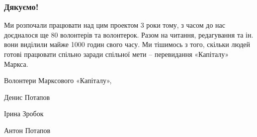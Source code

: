 \documentclass{kapital}
\begin{document}
{  \subsubsection*{Дякуємо!}

  Ми розпочали працювати над цим проектом 3 роки тому, з часом до нас доєдналося ще 80 волонтерів та волонтерок. Разом на читання, редагування та ін. вони виділили майже 1000 годин свого часу. Ми тішимось з того, скільки людей готові працювати спільно заради спільної мети – перевидання «Капіталу» Маркса. 

  \bigskip{}

  \noindent{}Волонтери Марксового «Капіталу»,

  \medskip{}

  \noindent{}Денис Потапов

  \noindent{}Ірина Зробок

  \noindent{}Антон Потапов
}
\end{document}
